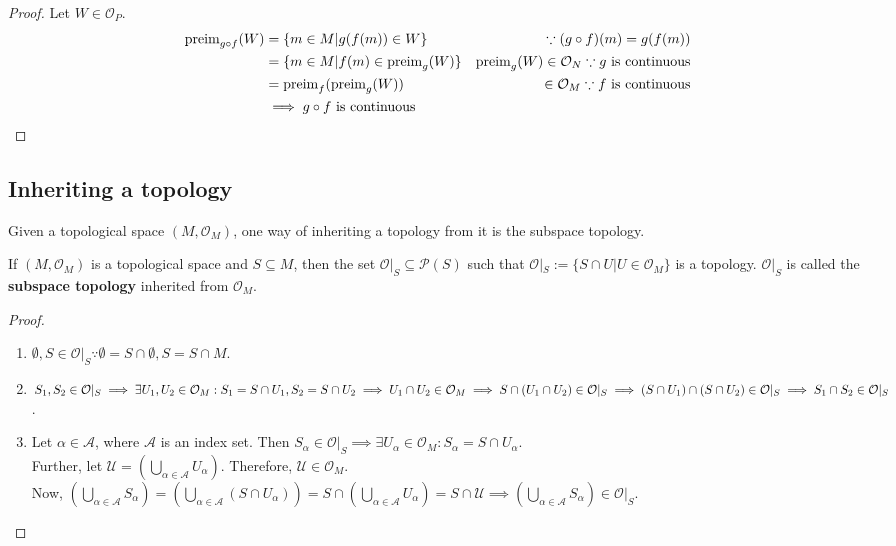 \begin{proof}
Let $W \in \mathcal{O}_{P}$. \begin{align*}
\text{preim}_{g \circ f}(W) &= \lbrace m \in M | g(f(m)) \in W \rbrace &\because (g \circ f)(m) = g(f(m)) \\
&= \lbrace m \in M | f(m) \in \text{preim}_{g}(W) \rbrace & \text{preim}_{g}(W) \in \mathcal{O}_{N} \because g \text{ is continuous} \\
&= \text{preim}_{f}(\text{preim}_{g}(W)) &\in \mathcal{O}_{M} \because f \text{ is continuous} \\
&\implies g \circ f \text{ is continuous}
\end{align*}
\end{proof}

\subsection{Inheriting a topology}
Given a topological space $(M, \mathcal{O}_{M})$, one way of inheriting a topology from it is the subspace topology.

\begin{theorem}
If $(M, \mathcal{O}_{M})$ is a topological space and $S \subseteq M$, then the set $\mathcal{O}|_S \subseteq \mathcal{P}(S)$ such that $\mathcal{O}|_S := \lbrace S \cap U | U \in \mathcal{O}_{M} \rbrace$ is a topology. $\mathcal{O}|_S$ is called the \textbf{subspace topology} inherited from $\mathcal{O}_{M}$.
\end{theorem}

\begin{proof}
\begin{enumerate}
\item $\emptyset, S \in \mathcal{O}|_S \because \emptyset = S \cap \emptyset, S = S \cap M$.

\item $S_1, S_2 \in \mathcal{O}|_S \implies \exists U_1, U_2 \in \mathcal{O}_{M} : S_1 = S \cap U_1, S_2 = S \cap U_2 \implies U_1 \cap U_2 \in \mathcal{O}_{M} \\
\implies S \cap (U_1 \cap U_2) \in \mathcal{O}|_S \implies (S \cap U_1) \cap (S \cap U_2) \in \mathcal{O}|_S \implies S_1 \cap S_2 \in \mathcal{O}|_S$.

\item Let $\alpha \in \mathcal{A}$, where $\mathcal{A}$ is an index set. Then $S_{\alpha} \in \mathcal{O}|_S \implies \exists U_{\alpha} \in \mathcal{O}_{M} : S_{\alpha} = S \cap U_{\alpha}$. \\
Further, let $\mathcal{U} = \left( \bigcup_{\alpha \in \mathcal{A}} U_{\alpha} \right)$. Therefore, $\mathcal{U} \in \mathcal{O}_{M}$. \\
Now, $\left( \bigcup_{\alpha \in \mathcal{A}} S_{\alpha} \right) = \left( \bigcup_{\alpha \in \mathcal{A}} (S \cap U_{\alpha}) \right) = S \cap \left( \bigcup_{\alpha \in \mathcal{A}} U_{\alpha} \right) = S \cap \mathcal{U} \implies \left( \bigcup_{\alpha \in \mathcal{A}} S_{\alpha} \right) \in \mathcal{O}|_S$.
\end{enumerate}
\end{proof}


